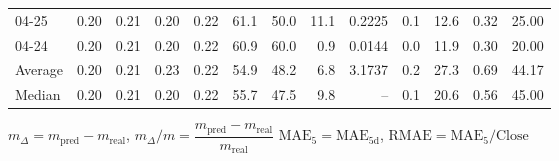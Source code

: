 \begin{threeparttable}
{\begin{tabular}{lrrrrrrrrrrrr}
  04-25 &          0.20 &          0.21 &          0.20 &        0.22 &                61.1 &                50.0 &       11.1 &       0.2225 &                 0.1 &             12.6 &            0.32 &                  25.00 \\
  04-24 &          0.20 &          0.21 &          0.20 &        0.22 &                60.9 &                60.0 &        0.9 &       0.0144 &                 0.0 &             11.9 &            0.30 &                  20.00 \\
Average &          0.20 &          0.21 &          0.23 &        0.22 &                54.9 &                48.2 &        6.8 &       3.1737 &                 0.2 &             27.3 &            0.69 &                  44.17 \\
 Median &          0.20 &          0.21 &          0.20 &        0.22 &                55.7 &                47.5 &        9.8 &           -- &                 0.1 &             20.6 &            0.56 &                  45.00 \\
\bottomrule
\end{tabular}
}
\begin{tablenotes}\footnotesize
\item $m_\Delta=m_{\text{pred}}-m_{\text{real}}$,
$m_\Delta/m=\dfrac{m_{\text{pred}}-m_{\text{real}}}{m_{\text{real}}}$
$\mathrm{MAE}_5=\mathrm{MAE}_{5\text{d}}$,
$\mathrm{RMAE}=\mathrm{MAE}_5/\text{Close}$
\end{tablenotes}
\end{threeparttable}
\endgroup

